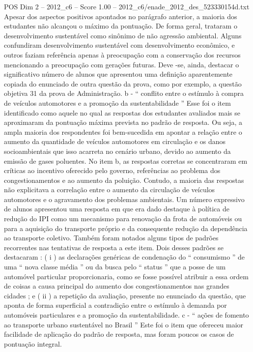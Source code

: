 \begin{textsample}{POS Dim 2 – 2012\_c6 – Score 1.00 – 2012\_c6/enade\_2012\_des\_523330154d.txt}
Apesar dos aspectos positivos apontados no parágrafo anterior, a maioria dos estudantes não alcançou o máximo da pontuação.
De forma geral, trataram o desenvolvimento sustentável como sinônimo de não agressão ambiental.
Alguns confundiram desenvolvimento sustentável com desenvolvimento econômico, e outros faziam referência apenas à preocupação com a conservação dos recursos mencionando a preocupação com gerações futuras.
Deve -se, ainda, destacar o significativo número de alunos que apresentou uma definição aparentemente copiada do enunciado de outra questão da prova, como por exemplo, a questão objetiva 31 da prova de Administração. b - “ conflito entre o estímulo à compra de veículos automotores e a promoção da sustentabilidade ” Esse foi o item identificado como aquele no qual as respostas dos estudantes avaliados mais se aproximaram da pontuação máxima prevista no padrão de resposta.
Ou seja, a ampla maioria dos respondentes foi bem-sucedida em apontar a relação entre o aumento da quantidade de veículos automotores em circulação e os danos socioambientais que isso acarreta no cenário urbano, devido ao aumento da emissão de gases poluentes.
No item b, as respostas corretas se concentraram em críticas ao incentivo oferecido pelo governo, referências ao problema dos congestionamentos e ao aumento da poluição.
Contudo, a maioria das respostas não explicitava a correlação entre o aumento da circulação de veículos automotores e o agravamento dos problemas ambientais.
Um número expressivo de alunos apresentou uma resposta em que era dado destaque à política de redução do IPI como um mecanismo para renovação da frota de automóveis ou para a aquisição do transporte próprio e da consequente redução da dependência ao transporte coletivo.
Também foram notados alguns tipos de padrões recorrentes nas tentativas de resposta a este item.
Dois desses padrões se destacaram : ( i ) as declarações genéricas de condenação do “ consumismo ” de uma “ nova classe média ” ou da busca pelo “ status ” que a posse de um automóvel particular proporcionaria, como se fosse possível atribuir a essa ordem de coisas a causa principal do aumento dos congestionamentos nas grandes cidades ; e ( ii ) a repetição da avaliação, presente no enunciado da questão, que aponta de forma superficial a contradição entre o estímulo à demanda por automóveis particulares e a promoção da sustentabilidade. c - “ ações de fomento ao transporte urbano sustentável no Brasil ” Este foi o item que ofereceu maior facilidade de aplicação do padrão de resposta, mas foram poucos os casos de pontuação integral.

\end{textsample}
